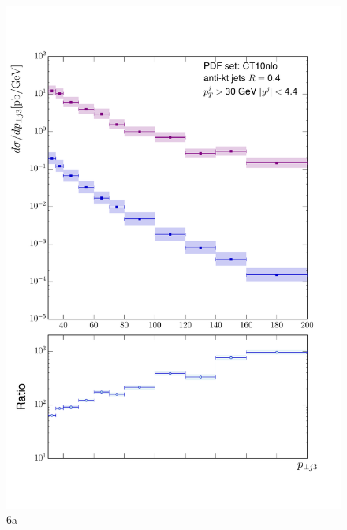 	\begin{figure}[h]
		\centering
		\includegraphics[width=0.8\linewidth]{Figures/ATLAS_Z_100TeV_6a.pdf}
		\caption{6a}
		\label{fig:emissionsites}
	\end{figure}

